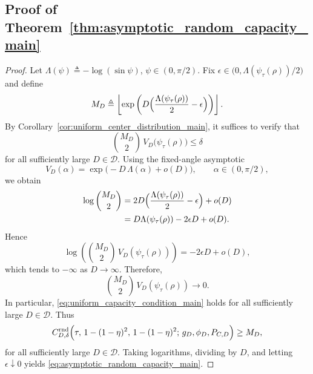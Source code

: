 \documentclass[journal]{IEEEtran}
\begin{document}
\begin{bibunit}
\subsection{Proof of Theorem~\ref{thm:asymptotic_random_capacity_main}}
\label{app:proof_thm_asymptotic_random_capacity}



\begin{proof}
%
Let $\Lambda(\psi)\triangleq -\log(\sin\psi)$, $\psi\in(0,\pi/2)$. Fix $\epsilon\in\bigl(0,\Lambda(\psi_\tau(\rho))/2\bigr)$ and define
%
\begin{equation}
M_D \triangleq \left\lfloor \exp \left( D\Bigl(\frac{\Lambda(\psi_\tau(\rho))}{2}-\epsilon\Bigr)
\right) \right\rfloor.
\end{equation}
%
By Corollary~\ref{cor:uniform_center_distribution_main}, it suffices to verify that
%
\begin{equation}
\binom{M_D}{2}\,V_D \bigl(\psi_\tau(\rho)\bigr)\le \delta
\end{equation}
%
for all sufficiently large $D\in\mathcal D$. Using the fixed-angle asymptotic
%
\begin{equation}
V_D(\alpha) = \exp \bigl( -D\,\Lambda(\alpha)+o(D) \bigr), \qquad \alpha\in(0,\pi/2),
\end{equation}
%
we obtain
%
\begin{subequations}
\begin{align}
\log \binom{M_D}{2} & = 2D\Bigl(\frac{\Lambda(\psi_\tau(\rho))}{2}-\epsilon\Bigr)+o(D) \\
& = D\Lambda(\psi_\tau(\rho))-2\epsilon D+o(D).    
\end{align}    
\end{subequations}
%
Hence
%
\begin{equation}
\log \left( \binom{M_D}{2}\,V_D(\psi_\tau(\rho)) \right)
= -2\epsilon D+o(D),
\end{equation}
%
which tends to $-\infty$ as $D\to\infty$. Therefore,
%
\begin{equation}
\binom{M_D}{2}\,V_D(\psi_\tau(\rho))\to 0.
\end{equation}
%
In particular, \eqref{eq:uniform_capacity_condition_main} holds for all sufficiently large $D\in\mathcal D$. Thus
%
\begin{equation}
C_{D,\delta}^{\mathrm{rnd}} \Bigl( \tau,\,
1-(1-\eta)^2,\, 1-(1-\eta)^2;\, g_D,\phi_D,P_{C,D}
\Bigr) \ge M_D,
\end{equation}
%
for all sufficiently large $D\in\mathcal D$. Taking logarithms, dividing by $D$, and letting $\epsilon\downarrow 0$ yields \eqref{eq:asymptotic_random_capacity_main}.
%
\end{proof}






\end{bibunit}
\end{document}
